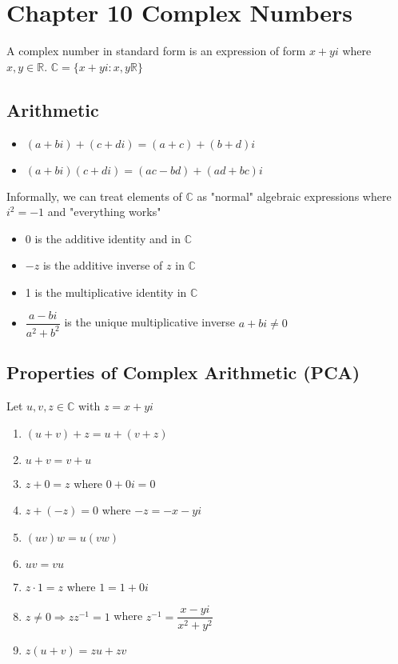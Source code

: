 \documentclass[12pt, letterpaper]{article}
\begin{document}
\section{Chapter 10 Complex Numbers}
A complex number in standard form is an expression of form $x + yi$ where $x,y \in \mathbb{R}$. $\mathbb{C} = \{x + yi : x,y \mathbb{R}\}$
\subsection{Arithmetic}
\begin{itemize}
    \item $(a+bi) + (c+di) = (a+c) + (b+d)i$
    \item $(a+bi)(c+di) = (ac-bd) + (ad+bc)i$
\end{itemize}
Informally, we can treat elements of $\mathbb{C}$ as "normal" algebraic expressions where $i^2 = -1$ and "everything works"
\begin{itemize}
    \item 0 is the additive identity and in $\mathbb{C}$
    \item $-z$ is the additive inverse of $z$ in $\mathbb{C}$
    \item 1 is the multiplicative identity in $\mathbb{C}$
    \item $\dfrac{a-bi}{a^2+b^2}$ is the unique multiplicative inverse $a+bi \neq 0$
\end{itemize}
\subsection{Properties of Complex Arithmetic (PCA)}
Let $u,v,z \in \mathbb{C}$ with $z = x+yi$
\begin{enumerate}
    \item $(u+v)+z = u+(v+z)$
    \item $u+v = v+u$
    \item $z+0 = z$ where $0+0i = 0$
    \item $z+(-z) = 0$ where $-z = -x-yi$
    \item $(uv)w = u(vw)$
    \item $uv = vu$
    \item $z \cdot 1 = z$ where $1 = 1+0i$
    \item $z \neq 0 \Rightarrow zz^{-1} = 1$ where $z^{-1} = \dfrac{x-yi}{x^2+y^2}$
    \item $z(u+v) = zu + zv$
\end{enumerate}
\end{document}

